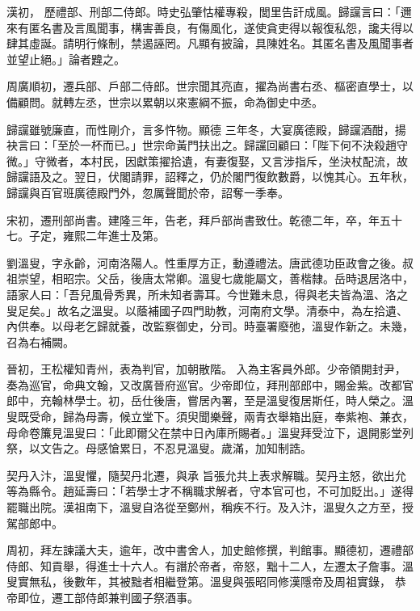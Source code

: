 \begin{pinyinscope}
 漢初，
 歷禮部、刑部二侍郎。時史弘肇怙權專殺，閭里告訐成風。歸讜言曰：「邇來有匿名書及言風聞事，構害善良，有傷風化，遂使貪吏得以報復私怨，讒夫得以肆其虛誕。請明行條制，禁遏誣罔。凡顯有披論，具陳姓名。其匿名書及風聞事者並望止絕。」論者韙之。



 周廣順初，遷兵部、戶部二侍郎。世宗聞其亮直，擢為尚書右丞、樞密直學士，以備顧問。就轉左丞，世宗以累朝以來憲綱不振，命為御史中丞。



 歸讜雖號廉直，而性剛介，言多忤物。顯德
 三年冬，大宴廣德殿，歸讜酒酣，揚袂言曰：「至於一杯而已。」世宗命黃門扶出之。歸讜回顧曰：「陛下何不決殺趙守微。」守微者，本村民，因獻策擢拾遺，有妻復娶，又言涉指斥，坐決杖配流，故歸讜語及之。翌日，伏閣請罪，詔釋之，仍於閣門復飲數爵，以愧其心。五年秋，歸讜與百官班廣德殿門外，忽厲聲聞於帝，詔奪一季奉。



 宋初，遷刑部尚書。建隆三年，告老，拜戶部尚書致仕。乾德二年，卒，年五十七。子定，雍熙二年進士及第。



 劉溫叟，字永齡，河南洛陽人。性重厚方正，動遵禮法。唐武德功臣政會之後。叔祖崇望，相昭宗。父岳，後唐太常卿。溫叟七歲能屬文，善楷隸。岳時退居洛中，語家人曰：「吾兒風骨秀異，所未知者壽耳。今世難未息，得與老夫皆為溫、洛之叟足矣。」故名之溫叟。以蔭補國子四門助教，河南府文學。清泰中，為左拾遺、內供奉。以母老乞歸就養，改監察御史，分司。時臺署廢弛，溫叟作新之。未幾，召為右補闕。



 晉初，王松權知青州，表為判官，加朝散階。
 入為主客員外郎。少帝領開封尹，奏為巡官，命典文翰，又改廣晉府巡官。少帝即位，拜刑部郎中，賜金紫。改都官郎中，充翰林學士。初，岳仕後唐，嘗居內署，至是溫叟復居斯任，時人榮之。溫叟既受命，歸為母壽，候立堂下。須臾聞樂聲，兩青衣舉箱出庭，奉紫袍、兼衣，母命卷簾見溫叟曰：「此即爾父在禁中日內庫所賜者。」溫叟拜受泣下，退開影堂列祭，以文告之。母感愴累日，不忍見溫叟。歲滿，加知制誥。



 契丹入汴，溫叟懼，隨契丹北遷，與承
 旨張允共上表求解職。契丹主怒，欲出允等為縣令。趙延壽曰：「若學士才不稱職求解者，守本官可也，不可加貶出。」遂得罷職出院。漢祖南下，溫叟自洛從至鄭州，稱疾不行。及入汴，溫叟久之方至，授駕部郎中。



 周初，拜左諫議大夫，逾年，改中書舍人，加史館修撰，判館事。顯德初，遷禮部侍郎、知貢舉，得進士十六人。有譖於帝者，帝怒，黜十二人，左遷太子詹事。溫叟實無私，後數年，其被黜者相繼登第。溫叟與張昭同修漢隱帝及周祖實錄，
 恭帝即位，遷工部侍郎兼判國子祭酒事。




\end{pinyinscope}
